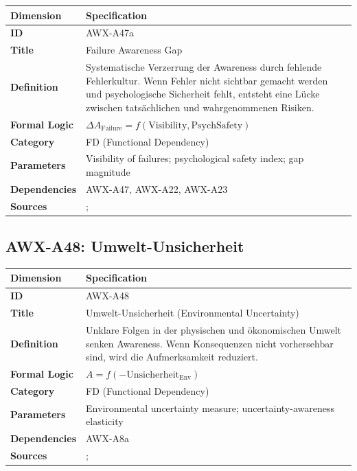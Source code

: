 \begin{table}[htbp]
\small
\begin{tabular}{p{3cm}p{11cm}}
\toprule
\textbf{Dimension} & \textbf{Specification} \\
\midrule
\textbf{ID} & AWX-A47a \\
\textbf{Title} & Failure Awareness Gap \\
\textbf{Definition} & Systematische Verzerrung der Awareness durch fehlende Fehlerkultur. Wenn Fehler nicht sichtbar gemacht werden und psychologische Sicherheit fehlt, entsteht eine Lücke zwischen tatsächlichen und wahrgenommenen Risiken. \\
\textbf{Formal Logic} & $\Delta A_{\text{Failure}} = f(\text{Visibility}, \text{PsychSafety})$ \\
\textbf{Category} & FD (Functional Dependency) \\
\textbf{Parameters} & Visibility of failures; psychological safety index; gap magnitude \\
\textbf{Dependencies} & AWX-A47, AWX-A22, AWX-A23 \\
\textbf{Sources} & \citet{edmondson1999psychological}; \citet{tucker2007learning} \\
\bottomrule
\end{tabular}
\end{table}


\subsection{AWX-A48: Umwelt-Unsicherheit}

\begin{table}[htbp]
\small
\begin{tabular}{p{3cm}p{11cm}}
\toprule
\textbf{Dimension} & \textbf{Specification} \\
\midrule
\textbf{ID} & AWX-A48 \\
\textbf{Title} & Umwelt-Unsicherheit (Environmental Uncertainty) \\
\textbf{Definition} & Unklare Folgen in der physischen und ökonomischen Umwelt senken Awareness. Wenn Konsequenzen nicht vorhersehbar sind, wird die Aufmerksamkeit reduziert. \\
\textbf{Formal Logic} & $A = f(-\text{Unsicherheit}_{\text{Env}})$ \\
\textbf{Category} & FD (Functional Dependency) \\
\textbf{Parameters} & Environmental uncertainty measure; uncertainty-awareness elasticity \\
\textbf{Dependencies} & AWX-A8a \\
\textbf{Sources} & \citet{knight1921risk}; \citet{ellsberg1961risk} \\
\bottomrule
\end{tabular}
\end{table}

